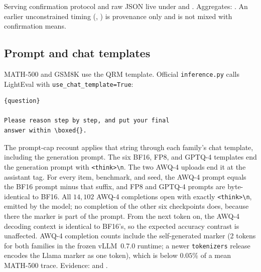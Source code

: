 \documentclass[11pt,a4paper]{article}
\begin{document}
Serving confirmation protocol and raw JSON live under  and . Aggregates: . An earlier unconstrained timing (, ) is provenance only and is not mixed with confirmation means.

\FloatBarrier
\subsection{Prompt and chat templates}
\label{sec:prompt}
MATH-500 and GSM8K use the QRM template. Official \texttt{inference.py} calls LightEval with \texttt{use\_chat\_template=True}:
\begin{verbatim}
{question}

Please reason step by step, and put your final
answer within \boxed{}.
\end{verbatim}
The prompt-cap recount applies that string through each family's chat template, including the generation prompt. The six BF16, FP8, and GPTQ-4 templates end the generation prompt with \texttt{<think>\textbackslash n}. The two AWQ-4 uploads end it at the assistant tag. For every item, benchmark, and seed, the AWQ-4 prompt equals the BF16 prompt minus that suffix, and FP8 and GPTQ-4 prompts are byte-identical to BF16. All $14{,}102$ AWQ-4 completions open with exactly \texttt{<think>\textbackslash n}, emitted by the model; no completion of the other six checkpoints does, because there the marker is part of the prompt. From the next token on, the AWQ-4 decoding context is identical to BF16's, so the expected accuracy contrast is unaffected. AWQ-4 completion counts include the self-generated marker (2 tokens for both families in the frozen vLLM~0.7.0 runtime; a newer \texttt{tokenizers} release encodes the Llama marker as one token), which is below $0.05\%$ of a mean MATH-500 trace. Evidence:  and .
\end{document}
